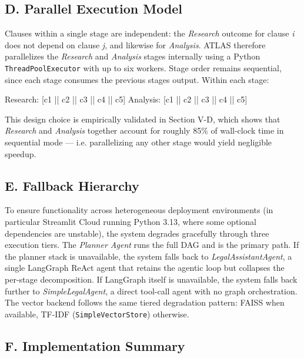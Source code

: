 \documentclass[
  twocolumn]{article}
\newenvironment{Shaded}{}{}
\newcommand{\NormalTok}[1]{#1}
\begin{document}
\subsection{D. Parallel Execution
Model}\label{d.-parallel-execution-model}

Clauses within a single stage are independent: the \emph{Research}
outcome for clause \emph{i} does not depend on clause \emph{j}, and
likewise for \emph{Analysis}. ATLAS therefore parallelizes the
\emph{Research} and \emph{Analysis} stages internally using a Python
\texttt{ThreadPoolExecutor} with up to six workers. Stage order remains
sequential, since each stage consumes the previous
stage\textquotesingle s output. Within each stage:

\begin{Shaded}
\begin{Highlighting}[]
\NormalTok{Research:  [c1 || c2 || c3 || c4 || c5]}
\NormalTok{Analysis:  [c1 || c2 || c3 || c4 || c5]}
\end{Highlighting}
\end{Shaded}

This design choice is empirically validated in Section V-D, which shows
that \emph{Research} and \emph{Analysis} together account for roughly
85\% of wall-clock time in sequential mode --- i.e. parallelizing any
other stage would yield negligible speedup.

\subsection{E. Fallback Hierarchy}\label{e.-fallback-hierarchy}

To ensure functionality across heterogeneous deployment environments (in
particular Streamlit Cloud running Python 3.13, where some optional
dependencies are unstable), the system degrades gracefully through three
execution tiers. The \emph{Planner Agent} runs the full DAG and is the
primary path. If the planner stack is unavailable, the system falls back
to \emph{LegalAssistantAgent}, a single LangGraph ReAct agent that
retains the agentic loop but collapses the per-stage decomposition. If
LangGraph itself is unavailable, the system falls back further to
\emph{SimpleLegalAgent}, a direct tool-call agent with no graph
orchestration. The vector backend follows the same tiered degradation
pattern: FAISS when available, TF-IDF (\texttt{SimpleVectorStore})
otherwise.

\subsection{F. Implementation Summary}\label{f.-implementation-summary}
\end{document}

